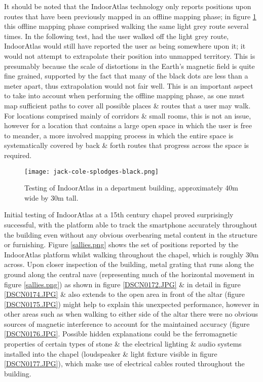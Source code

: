 It should be noted that the IndoorAtlas technology only reports positions upon routes that have been previously mapped in an offline mapping phase; in figure \ref{jack-cole-splodges-black.png} this offline mapping phase comprised walking the same light grey route several times. In the following test, had the user walked off the light grey route, IndoorAtlas would still have reported the user as being somewhere upon it; it would not attempt to extrapolate their position into unmapped territory. This is presumably because the scale of distortions in the Earth's magnetic field is quite fine grained, supported by the fact that many of the black dots are less than a meter apart, thus extrapolation would not fair well. This is an important aspect to take into account when performing the offline mapping phase, as one must map sufficient paths to cover all possible places \& routes that a user may walk. For locations comprised mainly of corridors \& small rooms, this is not an issue, however for a location that contains a large open space in which the user is free to meander, a more involved mapping process in which the entire space is systematically covered by back \& forth routes that progress across the space is required.

\begin{figure}[h]
	\begin{center}
		\texttt{[image: jack-cole-splodges-black.png]}
		\caption{Testing of IndoorAtlas in a department building, approximately 40m wide by 30m tall.}
		\label{jack-cole-splodges-black.png}
	\end{center}
\end{figure}

Initial testing of IndoorAtlas at a 15th century chapel proved surprisingly successful, with the platform able to track the smartphone accurately throughout the building even without any obvious overbearing metal content in the structure or furnishing. Figure \ref{sallies.png} shows the set of positions reported by the IndoorAtlas platform whilst walking throughout the chapel, which is roughly 30m across. Upon closer inspection of the building, metal grating that runs along the ground along the central nave (representing much of the horizontal movement in figure \ref{sallies.png}) as shown in figure \ref{DSCN0172.JPG} \& in detail in figure \ref{DSCN0174.JPG} \& also extends to the open area in front of the altar (figure \ref{DSCN0175.JPG}) might help to explain this unexpected performance, however in other areas such as when walking to either side of the altar there were no obvious sources of magnetic interference to account for the maintained accuracy (figure \ref{DSCN0176.JPG}. Possible hidden explanations could be the ferromagnetic properties of certain types of stone \& the electrical lighting \& audio systems installed into the chapel (loudspeaker \& light fixture visible in figure \ref{DSCN0177.JPG}), which make use of electrical cables routed throughout the building.

